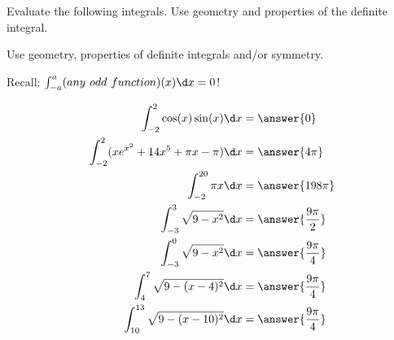 \documentclass{ximera}
\author{Nela Lakos \and Kyle Parsons}
\begin{document}
\begin{exercise}

Evaluate the following integrals.  Use geometry and properties of the definite integral.
\begin{hint}
Use  geometry, properties of definite integrals and/or symmetry.

Recall: $\int_{-a}^a (any \hspace{0.05in}odd\hspace{0.05in} function)(x) \d x =0$!
\end{hint}
\begin{align*}
\int_{-2}^2 \cos(x)\sin(x) \d x &= \answer{0}\\
\int_{-2}^2 (xe^{x^2} + 14x^5 + \pi x - \pi) \d x &= \answer{4\pi}\\
\int_{-2}^{20} \pi x \d x &= \answer{198\pi}\\
\int_{-3}^3 \sqrt{9-x^2} \d x &= \answer{\frac{9\pi}{2}}\\
\int_{-3}^0 \sqrt{9-x^2} \d x &= \answer{\frac{9\pi}{4}}\\
\int_4^7 \sqrt{9-(x-4)^2} \d x &= \answer{\frac{9\pi}{4}}\\
\int_{10}^{13} \sqrt{9-(x-10)^2} \d x &= \answer{\frac{9\pi}{4}}
\end{align*}

\end{exercise}
\end{document}
